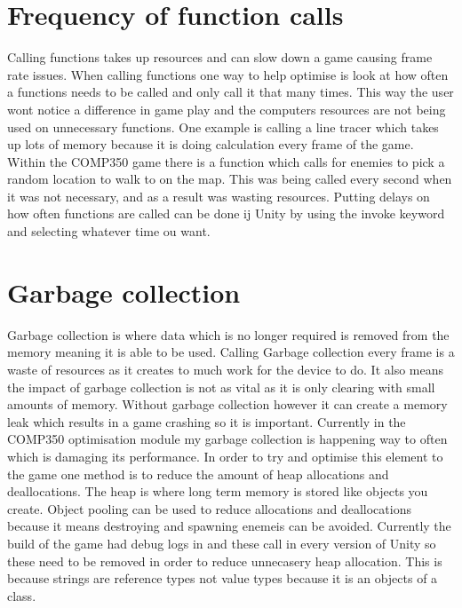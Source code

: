 \documentclass[journal]{IEEEtran}
\begin{document}
\section{Frequency of function calls}
Calling functions takes up resources and can slow down a game causing frame rate issues.%
When calling functions one way to help optimise is look at how often a functions needs to be called and only call it that many times.
This way the user wont notice a difference in game play and the computers resources are not being used on unnecessary functions.
One example is calling a line tracer which takes up lots of memory because it is doing calculation every frame of the game.
Within the COMP350 game there is a function which calls for enemies to pick a random location to walk to on the map.
This was being called every second when it was not necessary, and as a result was wasting resources.
Putting delays on how often functions are called can be done ij Unity by using the invoke keyword and selecting whatever time ou want.

\section{Garbage collection}
Garbage collection is where data which is no longer required is removed from the memory meaning it is able to be used.%
Calling Garbage collection every frame is a waste of resources as it creates to much work for the device to do.
It also means the impact of garbage collection is not as vital as it is only clearing with small amounts of memory.
Without garbage collection however it can create a memory leak which results in a game crashing so it is important.
Currently in the COMP350 optimisation module my garbage collection is happening way to often which is damaging its performance.
In order to try and optimise this element to the game one method is to reduce the amount of heap allocations and deallocations.
The heap is where long term memory is stored like objects you create.%
Object pooling can be used to reduce allocations and deallocations because it means destroying and spawning enemeis can be avoided.
Currently the build of the game had debug logs in and these call in every version of Unity so these need to be removed in order to reduce unnecasery heap allocation. 
This is because strings are reference types not value types because it is an objects of a class.
\end{document}
